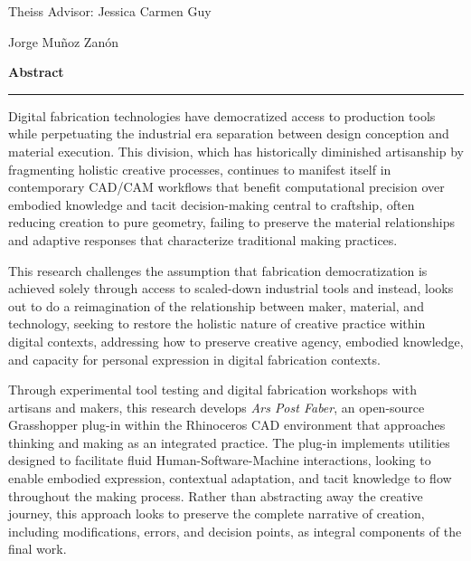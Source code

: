 \noindent
\begin{minipage}[t]{0.5\textwidth}
\raggedright
Theiss Advisor: Jessica Carmen Guy
\end{minipage}%
\begin{minipage}[t]{0.5\textwidth}
\raggedleft
Jorge Muñoz Zanón
\end{minipage}
\vspace{1cm}

\noindent
{\Large\textbf{Abstract}}
\vspace{0.3cm}
\hrule
\vspace{0.8cm}

\setlength{\parindent}{0pt}

Digital fabrication technologies have democratized access to production tools while perpetuating the industrial era separation between design conception and material execution. This division, which has historically diminished artisanship by fragmenting holistic creative processes, continues to manifest itself in contemporary CAD/CAM workflows that benefit computational precision over embodied knowledge and tacit decision-making central to craftship, often reducing creation to pure geometry, failing to preserve the material relationships and adaptive responses that characterize traditional making practices.

\vspace{0.5cm}

This research challenges the assumption that fabrication democratization is achieved solely through access to scaled-down industrial tools and instead, looks out to do a reimagination of the relationship between maker, material, and technology, seeking to restore the holistic nature of creative practice within digital contexts, addressing how to preserve creative agency, embodied knowledge, and capacity for personal expression in digital fabrication contexts.

\vspace{0.5cm}

Through experimental tool testing and digital fabrication workshops with artisans and makers, this research develops \textit{Ars Post Faber}, an open-source Grasshopper plug-in within the Rhinoceros CAD environment that approaches thinking and making as an integrated practice. The plug-in implements utilities designed to facilitate fluid Human-Software-Machine interactions, looking to enable embodied expression, contextual adaptation, and tacit knowledge to flow throughout the making process. Rather than abstracting away the creative journey, this approach looks to preserve the complete narrative of creation, including modifications, errors, and decision points, as integral components of the final work.

